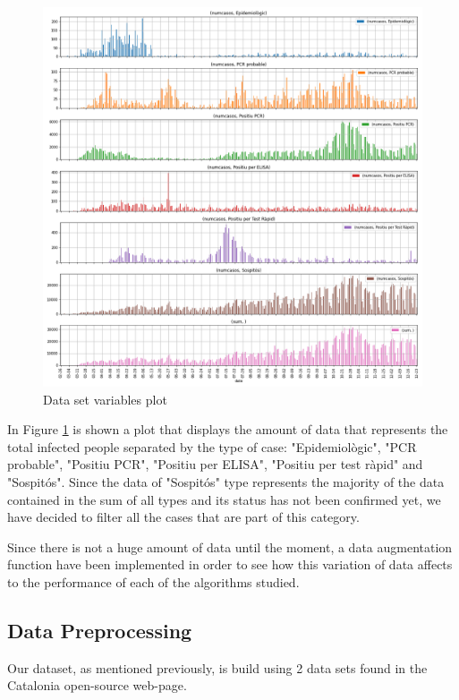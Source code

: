 \documentclass[anon]{CI}
\begin{document}
 \begin{figure}[ht!]
     \center
     \includegraphics[width=\linewidth]{plotpermethod.png}
     \caption{Data set variables plot}
     \label{fig:Dataset_variables_plot}
 \end{figure}

In Figure \ref{fig:Dataset_variables_plot} is shown a plot that displays the amount of data that represents the total infected people separated by the type of case: "Epidemiològic", "PCR probable", "Positiu PCR", "Positiu per ELISA", "Positiu per test ràpid" and "Sospitós". Since the data of "Sospitós" type represents the majority of the data contained in the sum of all types and its status has not been confirmed yet, we have decided to filter all the cases that are part of this category.

Since there is not a huge amount of data until the moment, a data augmentation function have been implemented in order to see how this variation of data affects to the performance of each of the algorithms studied.

\subsection{Data Preprocessing}
Our dataset, as mentioned previously, is build using 2 data sets found in the Catalonia open-source web-page.
\end{document}
